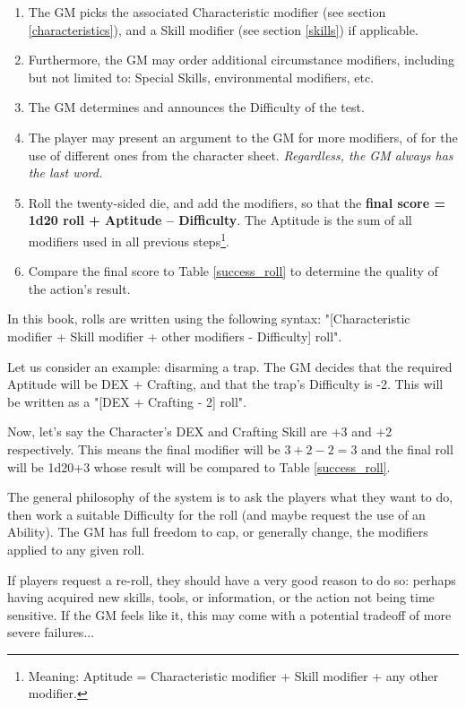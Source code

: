 \begin{enumerate}
    \item The GM picks the associated Characteristic modifier (see section \ref{characteristics}), and a Skill modifier (see section \ref{skills}) if applicable. 
    \item Furthermore, the GM may order additional circumstance modifiers, including but not limited to: Special Skills, environmental modifiers, etc.
	\item The GM determines and announces the Difficulty of the test.
    \item The player may present an argument to the GM for more modifiers, of for the use of different ones from the character sheet. \textit{Regardless, the GM always has the last word.}
    \item Roll the twenty-sided die, and add the modifiers, so that the \textbf{final score = 1d20 roll + Aptitude – Difficulty}. The Aptitude is the sum of all modifiers used in all previous steps\footnote{Meaning: Aptitude = Characteristic modifier + Skill modifier + any other modifier.}.
    \item Compare the final score to Table \ref{success_roll} to determine the quality of the action's result.
\end{enumerate}


\begin{rpg-examplebox}
	In this book, rolls are written using the following syntax: "[Characteristic modifier + Skill modifier + other modifiers - Difficulty] roll".
\end{rpg-examplebox}


Let us consider an example: disarming a trap. The GM decides that the required Aptitude will be DEX + Crafting, and that the trap's Difficulty is -2. This will be written as a "[DEX + Crafting - 2] roll".

Now, let's say the Character's DEX and Crafting Skill are +3 and +2 respectively. This means the final modifier will be $3+2-2=3$ and the final roll will be 1d20+3 whose result will be compared to Table \ref{success_roll}.

The general philosophy of the system is to ask the players what they want to do, then work a suitable Difficulty for the roll (and maybe request the use of an Ability). The GM has full freedom to cap, or generally change, the modifiers applied to any given roll.

If players request a re-roll, they should have a very good reason to do so: perhaps having acquired new skills, tools, or information, or the action not being time sensitive. If the GM feels like it, this may come with a potential tradeoff of more severe failures...


